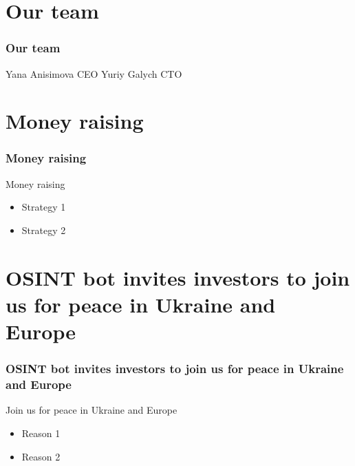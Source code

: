\documentclass{beamer}
\begin{document}
\section{Our team}

\begin{frame}
    \frametitle{Our team}
    
    \begin{block}{}
        Yana Anisimova CEO 
        Yuriy Galych CTO
    \end{block}
    
\end{frame}

\section{Money raising}

\begin{frame}
    \frametitle{Money raising}
    
    \begin{block}{Money raising}
        \begin{itemize}
            \item Strategy 1
            \item Strategy 2
        \end{itemize}
    \end{block}
    
\end{frame}


\section{OSINT bot invites investors to join us for peace in Ukraine and Europe}

\begin{frame}
    \frametitle{OSINT bot invites investors to join us for peace in Ukraine and Europe}
    
    \begin{block}{Join us for peace in Ukraine and Europe}
        \begin{itemize}
            \item Reason 1
            \item Reason 2
        \end{itemize}
    \end{block}
    
\end{frame}
\end{document}

